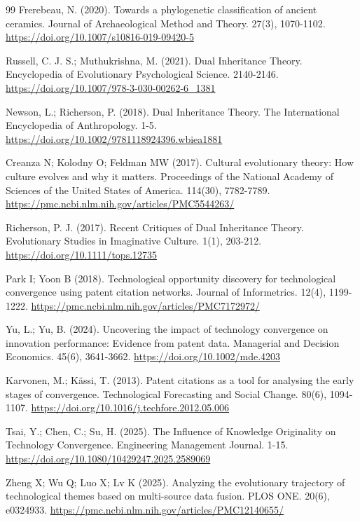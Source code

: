 \documentclass[11pt]{article}
\begin{document}
\begin{thebibliography}{99}
Frerebeau, N. (2020). Towards a phylogenetic classification of ancient ceramics. Journal of Archaeological Method and Theory. 27(3), 1070-1102. \url{https://doi.org/10.1007/s10816-019-09420-5}

Russell, C. J. S.; Muthukrishna, M. (2021). Dual Inheritance Theory. Encyclopedia of Evolutionary Psychological Science. 2140-2146. \url{https://doi.org/10.1007/978-3-030-00262-6\_1381}

Newson, L.; Richerson, P. (2018). Dual Inheritance Theory. The International Encyclopedia of Anthropology. 1-5. \url{https://doi.org/10.1002/9781118924396.wbiea1881}

Creanza N; Kolodny O; Feldman MW (2017). Cultural evolutionary theory: How culture evolves and why it matters. Proceedings of the National Academy of Sciences of the United States of America. 114(30), 7782-7789. \url{https://pmc.ncbi.nlm.nih.gov/articles/PMC5544263/}

Richerson, P. J. (2017). Recent Critiques of Dual Inheritance Theory. Evolutionary Studies in Imaginative Culture. 1(1), 203-212. \url{https://doi.org/10.1111/tops.12735}

Park I; Yoon B (2018). Technological opportunity discovery for technological convergence using patent citation networks. Journal of Informetrics. 12(4), 1199-1222. \url{https://pmc.ncbi.nlm.nih.gov/articles/PMC7172972/}

Yu, L.; Yu, B. (2024). Uncovering the impact of technology convergence on innovation performance: Evidence from patent data. Managerial and Decision Economics. 45(6), 3641-3662. \url{https://doi.org/10.1002/mde.4203}

Karvonen, M.; Kässi, T. (2013). Patent citations as a tool for analysing the early stages of convergence. Technological Forecasting and Social Change. 80(6), 1094-1107. \url{https://doi.org/10.1016/j.techfore.2012.05.006}

Tsai, Y.; Chen, C.; Su, H. (2025). The Influence of Knowledge Originality on Technology Convergence. Engineering Management Journal. 1-15. \url{https://doi.org/10.1080/10429247.2025.2589069}

Zheng X; Wu Q; Luo X; Lv K (2025). Analyzing the evolutionary trajectory of technological themes based on multi-source data fusion. PLOS ONE. 20(6), e0324933. \url{https://pmc.ncbi.nlm.nih.gov/articles/PMC12140655/}


\end{thebibliography}
\end{document}
